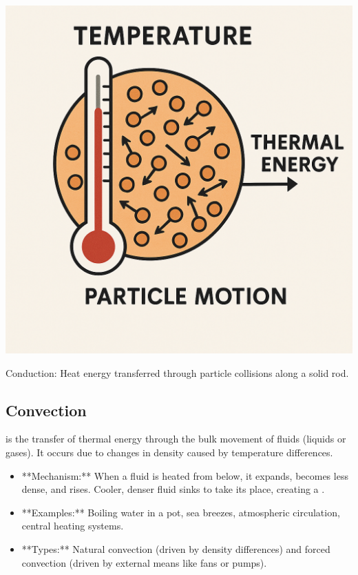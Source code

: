 \begin{marginfigure}[0pt]
\includegraphics[width=\linewidth]{thermal_energy.png} %
\caption{Conduction: Heat energy transferred through particle collisions along a solid rod.}
\label{fig:conduction}
\end{marginfigure}

\subsection{Convection}
\FloatBarrier

 is the transfer of thermal energy through the bulk movement of fluids (liquids or gases). It occurs due to changes in density caused by temperature differences.
\begin{itemize}
    \item **Mechanism:** When a fluid is heated from below, it expands, becomes less dense, and rises. Cooler, denser fluid sinks to take its place, creating a .
    \item **Examples:** Boiling water in a pot, sea breezes, atmospheric circulation, central heating systems.
    \item **Types:** Natural convection (driven by density differences) and forced convection (driven by external means like fans or pumps).
\end{itemize}

